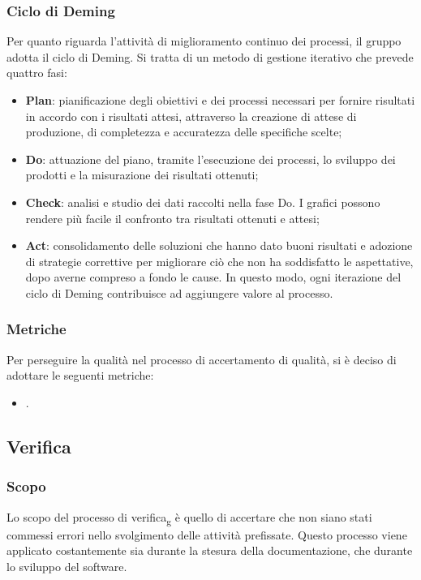 \subsubsection{Ciclo di Deming}
Per quanto riguarda l'attività di miglioramento continuo dei processi, il
gruppo adotta il ciclo di Deming. Si tratta di un metodo di gestione iterativo
che prevede quattro fasi:
\begin{itemize}
      \item \textbf{Plan}: pianificazione degli obiettivi e dei processi necessari per fornire
            risultati in accordo con i risultati attesi, attraverso la creazione di attese di
            produzione, di completezza e accuratezza delle specifiche scelte;
      \item \textbf{Do}: attuazione del piano, tramite l'esecuzione dei processi,
            lo sviluppo dei prodotti e la misurazione dei risultati ottenuti;
      \item \textbf{Check}: analisi e studio dei dati raccolti nella fase Do.
            I grafici possono rendere più facile il confronto tra risultati ottenuti e attesi;
      \item \textbf{Act}: consolidamento delle soluzioni che hanno dato buoni risultati e
            adozione di strategie correttive per migliorare ciò che non ha soddisfatto le aspettative,
            dopo averne compreso a fondo le cause. In questo modo, ogni iterazione del ciclo di Deming
            contribuisce ad aggiungere valore al processo.
\end{itemize}
\subsubsection{Metriche}
Per perseguire la qualità nel processo di accertamento di qualità, si è deciso
di adottare le seguenti metriche:
\begin{itemize}
      \item {}.
\end{itemize}
\subsection{Verifica}
\subsubsection{Scopo}
Lo scopo del processo di verifica\textsubscript{g} è quello di accertare che
non siano stati commessi errori nello svolgimento delle attività prefissate.
Questo processo viene applicato costantemente sia durante la stesura della
documentazione, che durante lo sviluppo del software.
